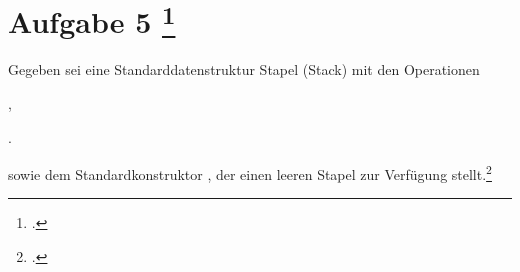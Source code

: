 \documentclass{bschlangaul-aufgabe}
\begin{document}

\section{Aufgabe 5
\footcite[Herbst 2014 (66115) - Thema 2 Aufgabe 5, Seite 5]{examen:66115:2014:09}}

Gegeben sei eine Standarddatenstruktur Stapel (Stack) mit den
Operationen

\bigskip

\begin{compactitem}
\item {}
\item {},
\item {}.
\end{compactitem}

\bigskip

\noindent
sowie dem Standardkonstruktor , der einen leeren Stapel
zur Verfügung stellt.\footcite[Seite 2-3, Aufgabe 5]{aud:ab:4}
\end{document}
